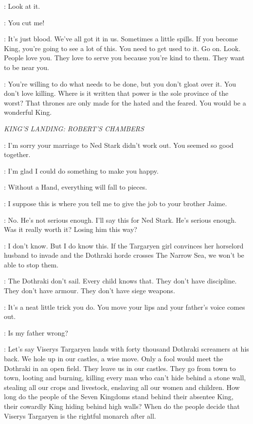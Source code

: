 \LORAS: Look at it. 

\RENLY: You cut me! 

\LORAS: It's just blood. We've all got it in us. Sometimes a little spills. If you become King, you're going to see a lot of this. You need to get used to it. Go on. Look. People love you. They love to serve you because you're kind to them. They want to be near you. 


\LORAS: You're willing to do what needs to be done, but you don't gloat over it. You don't love killing. Where is it written that power is the sole province of the worst? That thrones are only made for the hated and the feared. You would be a wonderful King. 


\scene

\textit{KING'S LANDING: ROBERT'S CHAMBERS} 


\CERSEI: I'm sorry your marriage to Ned Stark didn't work out. You seemed so good together. 

\ROBERT: I'm glad I could do something to make you happy. 

\CERSEI: Without a Hand, everything will fall to pieces. 

\ROBERT: I suppose this is where you tell me to give the job to your brother Jaime. 

\CERSEI: No. He's not serious enough. I'll say this for Ned Stark.  He's serious enough. Was it really worth it? Losing him this way? 

\ROBERT: I don't know. But I do know this.  If the Targaryen girl convinces her horselord husband to invade and the Dothraki horde crosses The Narrow Sea, we won't be able to stop them. 

\CERSEI: The Dothraki don't sail. Every child knows that. They don't have discipline. They don't have armour. They don't have siege weapons. 

\ROBERT: It's a neat little trick you do.  You move your lips and your father's voice comes out. 

\CERSEI: Is my father wrong? 

\ROBERT: Let's say Viserys Targaryen lands with forty thousand Dothraki screamers at his back. We hole up in our castles, a wise move. Only a fool would meet the Dothraki in an open field. They leave us in our castles. They go from town to town, looting and burning, killing every man who can't hide behind a stone wall, stealing all our crops and livestock, enslaving all our women and children. How long do the people of the Seven Kingdoms stand behind their absentee King, their cowardly King hiding behind high walls? When do the people decide that Viserys Targaryen is the rightful monarch after all. 


